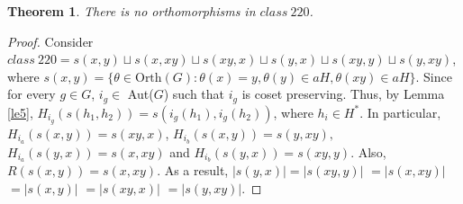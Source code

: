 \documentclass[11pt,a4paper]{article}
\newtheorem{theorem}{Theorem}[section]
\theoremstyle{definition}
\theoremstyle{remark}
\begin{document}
	\begin{theorem}\label{th2}
		There is no orthomorphisms in $class~220$.
	\end{theorem}
	\begin{proof}
		Consider $class~220 = s(x,y) \sqcup s(x,xy) \sqcup s(xy,x) \sqcup s(y,x) \sqcup s(xy,y) \sqcup s(y,xy)$,  where $s(x,y) = \{\theta \in \text{Orth}(G): \theta(x)=y, \theta(y) \in aH, \theta(xy) \in aH\}$.
		 Since for every $g \in G$, $i_{g} \in$ Aut($G$) such that $i_{g}$ is coset preserving. Thus, by Lemma \ref{le5}, $H_{i_{g}}(s(h_{1},h_{2})) = s(i_{g}(h_{1}), i_{g}(h_{2}))$, where $h_{i} \in H^{\ast}$. In particular, $H_{i_{a}}(s(x,y)) = s(xy,x)$,  $H_{i_{b}}(s(x,y)) = s(y,xy),$  $H_{i_{a}}(s(y,x)) = s(x,xy)$ and $H_{i_{b}}(s(y,x)) = s(xy,y)$. Also, $R(s(x,y)) = s(x,xy)$. As a result,  $\vert s(y,x) \vert = \vert s(xy,y) \vert$  $= \vert s(x,xy) \vert$ $= \vert s(x,y) \vert$ $= \vert s(xy,x) \vert$ $= \vert s(y,xy) \vert$.
		 

\end{proof}
\end{document}
